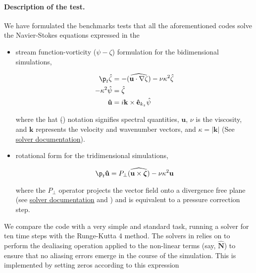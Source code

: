 \documentclass{../jors}
\begin{document}
\paragraph{Description of the test.} We have formulated the benchmarks tests
that all the aforementioned codes solve the Navier-Stokes equations expressed
in the
\begin{itemize}
  \item stream function-vorticity ($\psi-\zeta$) formulation for the
    bidimensional simulations,

    \begin{align*}
      \p_t \hat\zeta &= -(\widehat{\mathbf{u} \cdot \nabla \zeta}) - \nu
        \kappa^2 \hat \zeta \\
      -\kappa^2 \hat \psi &= \hat \zeta \\
      \mathbf{\hat u} &= i\mathbf{k} \times \mathbf{\hat e}_{k_z} \hat \psi
    \end{align*}

  where the hat ($\hat{}$) notation signifies spectral quantities,
  $\mathbf{u}$, $\nu$ is the viscosity, and $\mathbf{k}$ represents the
  velocity and wavenumber vectors,  and $\kappa = |\mathbf{k}|$ (See
  \href{https://fluidsim.readthedocs.io/en/latest/generated/fluidsim.solvers.ns2d.solver.html}{
  solver documentation}).

\item rotational form for the tridimensional simulations,

    \begin{align*}
      \p_t \mathbf{\hat u} = P_\perp \widehat{(\mathbf{u} \times \boldsymbol{\zeta})}
        - \nu \kappa ^ 2 \mathbf{u}
    \end{align*}

    where the $P_\perp$ operator projects the vector field onto a divergence free
    plane (see
  \href{https://fluidsim.readthedocs.io/en/latest/generated/fluidsim.solvers.ns3d.solver.html}{
  solver documentation} and \citet{canuto_algorithms_1988}) and is equivalent
  to a pressure correction step.

\end{itemize}
We compare the code with a very simple and standard task, running a solver for
ten time steps with the Runge-Kutta 4 method. The solvers in 
relies on  to perform the dealiasing operation applied to the
non-linear terms (say, $\mathbf{\hat N}$) to ensure that no aliasing errors emerge in
the course of the simulation. This is implemented by setting zeros according to
this expression
\end{document}
